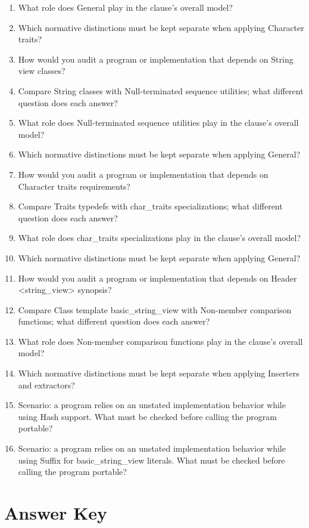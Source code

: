 \documentclass[11pt,letterpaper]{article}
\begin{document}
\begin{enumerate}
\item What role does General play in the clause's overall model?
\item Which normative distinctions must be kept separate when applying Character traits?
\item How would you audit a program or implementation that depends on String view classes?
\item Compare String classes with Null-terminated sequence utilities; what different question does each answer?
\item What role does Null-terminated sequence utilities play in the clause's overall model?
\item Which normative distinctions must be kept separate when applying General?
\item How would you audit a program or implementation that depends on Character traits requirements?
\item Compare Traits typedefs with char\_\allowbreak{}traits specializations; what different question does each answer?
\item What role does char\_\allowbreak{}traits specializations play in the clause's overall model?
\item Which normative distinctions must be kept separate when applying General?
\item How would you audit a program or implementation that depends on Header <string\_\allowbreak{}view> synopsis?
\item Compare Class template basic\_\allowbreak{}string\_\allowbreak{}view with Non-member comparison functions; what different question does each answer?
\item What role does Non-member comparison functions play in the clause's overall model?
\item Which normative distinctions must be kept separate when applying Inserters and extractors?
\item Scenario: a program relies on an unstated implementation behavior while using Hash support. What must be checked before calling the program portable?
\item Scenario: a program relies on an unstated implementation behavior while using Suffix for basic\_\allowbreak{}string\_\allowbreak{}view literals. What must be checked before calling the program portable?
\end{enumerate}
\clearpage\section{Answer Key}
\end{document}
